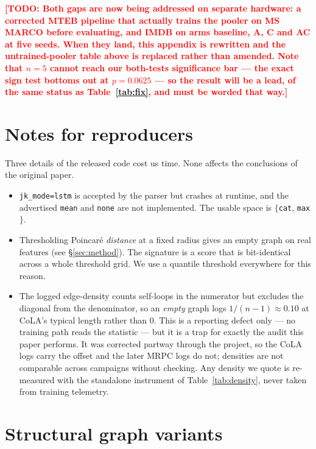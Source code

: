 \documentclass{article}
\newcommand{\TODO}[1]{\textcolor{red}{\textbf{[TODO: #1]}}}
\begin{document}
\TODO{Both gaps are now being addressed on separate hardware: a corrected MTEB
pipeline that actually trains the pooler on MS MARCO before evaluating, and
IMDB on arms baseline, A, C and AC at five seeds. When they land, this appendix
is rewritten and the untrained-pooler table above is replaced rather than
amended. Note that $n=5$ cannot reach our both-tests significance bar --- the
exact sign test bottoms out at $p=0.0625$ --- so the result will be a lead, of
the same status as Table~\ref{tab:fix}, and must be worded that way.}

\section{Notes for reproducers}
\label{app:defects}

Three details of the released code cost us time. None affects the conclusions of
the original paper.

\begin{itemize}
\itemsep1pt
\item \texttt{jk\_mode=lstm} is accepted by the parser but crashes at runtime,
      and the advertised \texttt{mean} and \texttt{none} are not implemented.
      The usable space is $\{$\texttt{cat}, \texttt{max}$\}$.
\item Thresholding Poincar\'e \emph{distance} at a fixed radius gives an empty
      graph on real features (see \S\ref{sec:method}). The signature is a score
      that is bit-identical across a whole threshold grid. We use a quantile
      threshold everywhere for this reason.
\item The logged edge-density counts self-loops in the numerator but excludes
      the diagonal from the denominator, so an \emph{empty} graph logs
      $1/(n{-}1) \approx 0.10$ at CoLA's typical length rather than $0$. This is
      a reporting defect only --- no training path reads the statistic --- but it
      is a trap for exactly the audit this paper performs. It was corrected
      partway through the project, so the CoLA logs carry the offset and the
      later MRPC logs do not; densities are not comparable across campaigns
      without checking. Any density we quote is re-measured with the standalone
      instrument of Table~\ref{tab:density}, never taken from training
      telemetry.
\end{itemize}

\section{Structural graph variants}
\label{app:structural}
\end{document}
